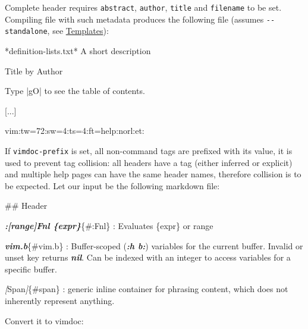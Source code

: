 \documentclass[
]{article}
\newenvironment{Shaded}{}{}
\newcommand{\CommentTok}[1]{\textcolor[rgb]{0.38,0.63,0.69}{\textit{#1}}}
\newcommand{\FunctionTok}[1]{\textcolor[rgb]{0.02,0.16,0.49}{#1}}
\newcommand{\InformationTok}[1]{\textcolor[rgb]{0.38,0.63,0.69}{\textbf{\textit{#1}}}}
\newcommand{\NormalTok}[1]{#1}
\newcommand{\OtherTok}[1]{\textcolor[rgb]{0.00,0.44,0.13}{#1}}
\begin{document}
Complete header requires \texttt{abstract}, \texttt{author},
\texttt{title} and \texttt{filename} to be set. Compiling file with such
metadata produces the following file (assumes \texttt{-\/-standalone},
see \protect\hyperlink{templates}{Templates}):

\begin{Shaded}
\begin{Highlighting}[]
\NormalTok{*definition{-}lists.txt*  A short description}

\NormalTok{                            Title by Author}


\NormalTok{                                 Type |gO| to see the table of contents.}

\NormalTok{[...]}

\NormalTok{ vim:tw=72:sw=4:ts=4:ft=help:norl:et:}
\end{Highlighting}
\end{Shaded}

If \texttt{vimdoc-prefix} is set, all non-command tags are prefixed with
its value, it is used to prevent tag collision: all headers have a tag
(either inferred or explicit) and multiple help pages can have the same
header names, therefore collision is to be expected. Let our input be
the following markdown file:

\begin{Shaded}
\begin{Highlighting}[]
\FunctionTok{\#\# Header}

\InformationTok{\textasciigrave{}:[range]Fnl \{expr\}\textasciigrave{}}\NormalTok{\{\#:Fnl\}}
\NormalTok{:   Evaluates \{expr\} or range}

\InformationTok{\textasciigrave{}vim.b\textasciigrave{}}\NormalTok{\{\#vim.b\}}
\NormalTok{:   Buffer{-}scoped (}\InformationTok{\textasciigrave{}:h b:\textasciigrave{}}\NormalTok{) variables for the current buffer. Invalid or unset}
\NormalTok{    key returns }\InformationTok{\textasciigrave{}nil\textasciigrave{}}\NormalTok{. Can be indexed with an integer to access variables for a}
\NormalTok{    specific buffer.}

\CommentTok{[}\OtherTok{Span}\CommentTok{]}\NormalTok{\{\#span\}}
\NormalTok{:   generic inline container for phrasing content, which does not inherently}
\NormalTok{    represent anything.}
\end{Highlighting}
\end{Shaded}

Convert it to vimdoc:
\end{document}
